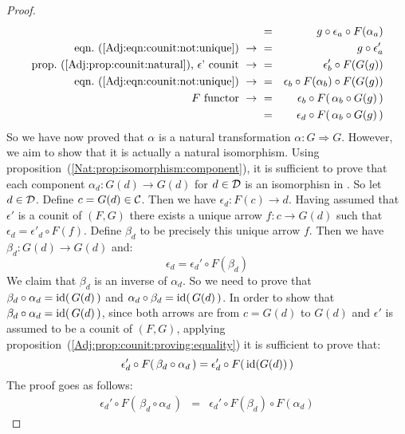 \begin{proof}
\begin{eqnarray*}
            &=&g\circ\epsilon_{a}\circ F(\alpha_{a})\\
            \mbox{eqn.~(\ref{Adj:eqn:counit:not:unique})}\ \to\ 
            &=&g\circ\epsilon_{a}'\\
            \mbox{prop.~(\ref{Adj:prop:counit:natural}), $\epsilon$' counit}\ \to\ 
            &=&\epsilon_{b}'\circ F(G(g))\\
            \mbox{eqn.~(\ref{Adj:eqn:counit:not:unique})}\ \to\ 
            &=&\epsilon_{b}\circ F(\alpha_{b})\circ F(G(g))\\
            \mbox{$F$ functor}\ \to\ 
            &=&\epsilon_{b}\circ F(\,\alpha_{b}\circ G(g)\,)\\
            &=&\epsilon_{d}\circ F(\,\alpha_{b}\circ G(g)\,)\\
        \end{eqnarray*}
    So we have now proved that $\alpha$ is a natural transformation
    $\alpha:G\Rightarrow G$. However, we aim to show that it is actually
    a natural isomorphism. 
    Using proposition~(\ref{Nat:prop:isomorphism:component}), it is sufficient
    to prove that each component $\alpha_{d}:G(d)\to G(d)$ for $d\in\mbox{$\cal D$}$ is 
    an isomorphisn in \Cat. So let $d\in\mbox{$\cal D$}$. Define $c=G(d)\in\mbox{$\cal C$}$. Then we 
    have $\epsilon_{d}:F(c)\to d$. Having assumed that $\epsilon'$ is a counit 
    of $(F,G)$ there exists a unique arrow $f:c\to G(d)$ such that 
    $\epsilon_{d}=\epsilon'_{d}\circ F(f)$. Define $\beta_{d}$ to be precisely this 
    unique arrow $f$. Then we have $\beta_{d}:G(d)\to G(d)$ and:
        \begin{equation}\label{Adj:eqn:counit:not:unique:2}
            \epsilon_{d}=\epsilon_{d}'\circ F(\beta_{d})
        \end{equation}
    We claim that $\beta_{d}$ is an inverse of $\alpha_{d}$. So we need to prove 
    that $\beta_{d}\circ\alpha_{d}=\mbox{\rm id}(\,G(d)\,)$ and 
    $\alpha_{d}\circ\beta_{d}=\mbox{\rm id}(\,G(d)\,)$.
    In order to show that $\beta_{d}\circ\alpha_{d}=\mbox{\rm id}(\,G(d)\,)$, since both 
    arrows are from $c=G(d)$ to $G(d)$ and $\epsilon'$ is assumed to be a counit 
    of $(F,G)$, applying proposition~(\ref{Adj:prop:counit:proving:equality}) it 
    is sufficient to prove that:
        \[
            \epsilon_{d}'\circ F(\,\beta_{d}\circ\alpha_{d}\,)
            = 
            \epsilon_{d}'\circ F(\,\mbox{\rm id}(G(d))\,)
        \]
    The proof goes as follows:
        \begin{eqnarray*}\epsilon_{d}'\circ F(\,\beta_{d}\circ\alpha_{d}\,)
            &=&\epsilon_{d}'\circ F(\beta_{d})\circ F(\alpha_{d})

\end{eqnarray*}
\end{proof}
